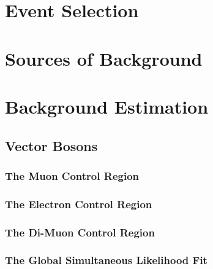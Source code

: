 \documentclass[10pt,twoside,cucitura,classica,english,openany]{toptesi}
\begin{document}


\section{Event Selection}
\label{sec:event-selection}



\section{Sources of Background}
\label{sec:sources-background}



\section{Background Estimation}
\label{sec:backgr-estim}



\subsection{Vector Bosons }
\label{sec:vector-bosons-}



\subsubsection{The Muon Control Region}
\label{sec:muon-control-region}



\subsubsection{The Electron Control Region}
\label{sec:electr-contr-regi}



\subsubsection{The Di-Muon Control Region}
\label{sec:di-muon-control}



\subsubsection{The Global Simultaneous Likelihood Fit}
\label{sec:glob-simult-likel}
\end{document}

